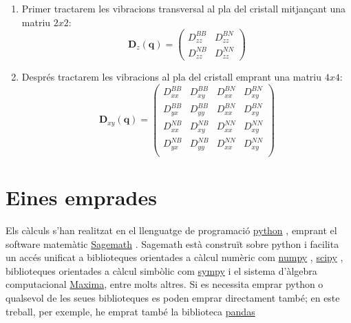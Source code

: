 \documentclass[12pt]{article} %
\let\vec\mathbf %
\begin{document}
\begin{enumerate}
 \item Primer tractarem les vibracions transversal al pla del cristall mitjançant una matriu $2x2$:
 \begin{equation}
  \vec D_z(\vec q)=
  \begin{pmatrix}
    D_{zz}^{BB}  & D_{zz}^{BN}        \\
    D_{zz}^{NB}  & D_{zz}^{NN} 
  \end{pmatrix}
\end{equation}

 \item Després tractarem les vibracions al pla del cristall emprant una matriu $4x4$:
 \begin{equation}
  \vec D_{xy}(\vec q)=
  \begin{pmatrix}
   D_{xx}^{BB} & D_{xy}^{BB} & D_{xx}^{BN} & D_{xy}^{BN}  \\
   D_{yx}^{BB} & D_{yy}^{BB} & D_{xx}^{BN} & D_{xy}^{BN}  \\
   D_{xx}^{NB} & D_{xy}^{NB} & D_{xx}^{NN} & D_{xy}^{NN} \\
   D_{yx}^{NB} & D_{yy}^{NB} & D_{xx}^{NN} & D_{xy}^{NN} \\
  \end{pmatrix}
\end{equation}

\end{enumerate}


 
\newpage


\section{Eines emprades}

Els càlculs s'han realitzat en el llenguatge de programació \href{https://www.python.org/}{python} \cite{4160250}, emprant el software matemàtic \href{https://www.sagemath.org/}{Sagemath} \cite{sagemath}. Sagemath està construït sobre python i facilita un accés unificat a biblioteques orientades a càlcul numèric com \href{https://numpy.org/}{numpy} \cite{harris2020array} , \href{https://scipy.org/}{scipy} \cite{2020SciPy-NMeth}, biblioteques orientades a càlcul simbòlic com \href{https://www.sympy.org/}{sympy} i el sistema d'àlgebra computacional \href{https://maxima.sourceforge.io/}{Maxima}, entre molts altres. Si es necessita emprar python o qualsevol de les seues biblioteques es poden emprar directament també; en este treball, per exemple, he emprat també la biblioteca \href{https://pandas.pydata.org/}{pandas}\cite{reback2020pandas} 
\end{document}
